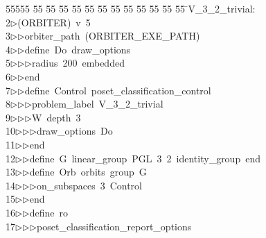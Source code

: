 %
%
\begin{tabbing}
55555 \= 55 \= 55 \= 55 \= 55 \= 55 \= 55 \= 55 \= 55 \= 55 \= 55 \= 55 \= 55 \= \>V\_3\_2\_trivial:\\[0pt]
2\>$\triangleright$\>(ORBITER)\ v\ 5\ \\[0pt]
3\>$\triangleright$\>$\triangleright$\>orbiter\_path\ (ORBITER\_EXE\_PATH)\ \\[0pt]
4\>$\triangleright$\>$\triangleright$\>define\ Do\ draw\_options\ \\[0pt]
5\>$\triangleright$\>$\triangleright$\>$\triangleright$\>radius\ 200\ embedded\ \\[0pt]
6\>$\triangleright$\>$\triangleright$\>end\ \\[0pt]
7\>$\triangleright$\>$\triangleright$\>define\ Control\ poset\_classification\_control\ \\[0pt]
8\>$\triangleright$\>$\triangleright$\>$\triangleright$\>problem\_label\ V\_3\_2\_trivial\ \\[0pt]
9\>$\triangleright$\>$\triangleright$\>$\triangleright$\>W\ depth\ 3\ \\[0pt]
10\>$\triangleright$\>$\triangleright$\>$\triangleright$\>draw\_options\ Do\ \\[0pt]
11\>$\triangleright$\>$\triangleright$\>end\ \\[0pt]
12\>$\triangleright$\>$\triangleright$\>define\ G\ linear\_group\ PGL\ 3\ 2\ identity\_group\ end\ \\[0pt]
13\>$\triangleright$\>$\triangleright$\>define\ Orb\ orbits\ group\ G\ \\[0pt]
14\>$\triangleright$\>$\triangleright$\>$\triangleright$\>on\_subspaces\ 3\ Control\ \\[0pt]
15\>$\triangleright$\>$\triangleright$\>end\ \\[0pt]
16\>$\triangleright$\>$\triangleright$\>define\ ro\ \\[0pt]
17\>$\triangleright$\>$\triangleright$\>$\triangleright$\>poset\_classification\_report\_options\ \\[0pt]

\end{tabbing}
